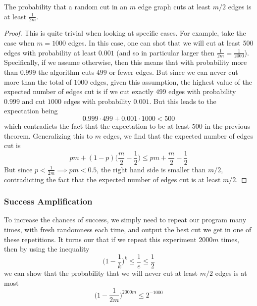  \begin{lemma}
    \label{thm:a-random-cut-cuts-half-the-edges}
  The probability that a random cut in an $m$ edge graph cuts at least $m/2$ edges is at least $\frac{1}{2m}$. 
  \end{lemma}
  \begin{proof}
  This is quite trivial when looking at specific cases. For example, take the case when $m =1000$ edges. In this case, one can shot that we will cut at least 500 edges with probability at least $0.001$ (and so in particular larger then $\frac{1}{2m} = \frac{1}{2000}$). Specifically, if we assume otherwise, then this means that with probability more than $0.999$ the algorithm cuts $499$ or fewer edges. But since we can never cut more than the total of $1000$ edges, given this assumption, the highest value of the expected number of edges cut is if we cut exactly $499$ edges with probability $0.999$ and cut $1000$ edges with probability $0.001$. But this leads to the expectation being
  \begin{equation}
    0.999 \cdot 499 + 0.001 \cdot 1000 < 500
  \end{equation}
  which contradicts the fact that the expectation to be at least $500$ in the previous theorem. Generalizing this to $m$ edges, we find that the expected number of edges cut is 
  \begin{equation}
    pm + (1-p) \Big( \frac{m}{2} - \frac{1}{2} \Big) \leq pm + \frac{m}{2} - \frac{1}{2}
  \end{equation}
  But since $p < \frac{1}{2m} \implies pm < 0.5$, the right hand side is smaller than $m/2$, contradicting the fact that the expected number of edges cut is at least $m/2$. 
  \end{proof}

  \subsubsection{Success Amplification}
  To increase the chances of success, we simply need to repeat our program many times, with fresh randomness each time, and output the best cut we get in one of these repetitions. It turns our that if we repeat this experiment $2000m$ times, then by using the inequality
  \begin{equation}
    \Big( 1 - \frac{1}{k} \Big)^k \leq \frac{1}{e} \leq \frac{1}{2}
  \end{equation}
  we can show that the probability that we will never cut at least $m/2$ edges is at most 
  \begin{equation}
    \Big( 1 - \frac{1}{2m} \Big)^{2000m} \leq 2^{-1000}
  \end{equation}

